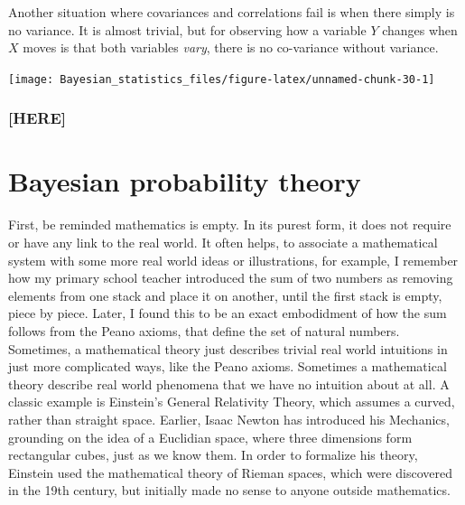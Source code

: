 \documentclass[]{svmono}
\newenvironment{Shaded}{\begin{snugshade}}{\end{snugshade}}
\newcommand{\KeywordTok}[1]{\textcolor[rgb]{0.13,0.29,0.53}{\textbf{#1}}}
\newcommand{\DataTypeTok}[1]{\textcolor[rgb]{0.13,0.29,0.53}{#1}}
\newcommand{\DecValTok}[1]{\textcolor[rgb]{0.00,0.00,0.81}{#1}}
\newcommand{\StringTok}[1]{\textcolor[rgb]{0.31,0.60,0.02}{#1}}
\newcommand{\OperatorTok}[1]{\textcolor[rgb]{0.81,0.36,0.00}{\textbf{#1}}}
\newcommand{\NormalTok}[1]{#1}
\begin{document}
Another situation where covariances and correlations fail is when there
simply is no variance. It is almost trivial, but for observing how a
variable \(Y\) changes when \(X\) moves is that both variables
\emph{vary}, there is no co-variance without variance.

\begin{Shaded}
\end{Shaded}

\texttt{[image: Bayesian\_statistics\_files/figure-latex/unnamed-chunk-30-1]}

\subsubsection{{[}HERE{]}}\label{here}

\section{Bayesian probability theory}\label{bayesian-probability-theory}

First, be reminded mathematics is empty. In its purest form, it does not
require or have any link to the real world. It often helps, to associate
a mathematical system with some more real world ideas or illustrations,
for example, I remember how my primary school teacher introduced the sum
of two numbers as removing elements from one stack and place it on
another, until the first stack is empty, piece by piece. Later, I found
this to be an exact embodidment of how the sum follows from the Peano
axioms, that define the set of natural numbers. Sometimes, a
mathematical theory just describes trivial real world intuitions in just
more complicated ways, like the Peano axioms. Sometimes a mathematical
theory describe real world phenomena that we have no intuition about at
all. A classic example is Einstein's General Relativity Theory, which
assumes a curved, rather than straight space. Earlier, Isaac Newton has
introduced his Mechanics, grounding on the idea of a Euclidian space,
where three dimensions form rectangular cubes, just as we know them. In
order to formalize his theory, Einstein used the mathematical theory of
Rieman spaces, which were discovered in the 19th century, but initially
made no sense to anyone outside mathematics.
\end{document}
